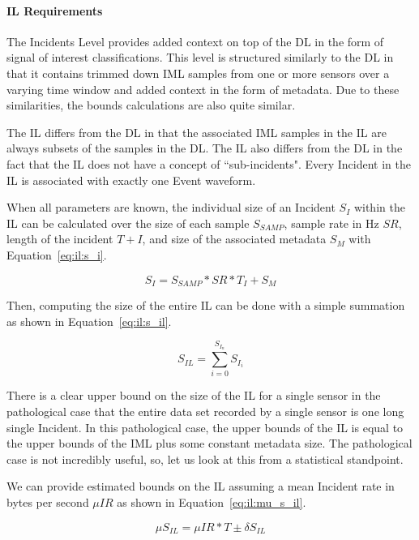 \paragraph{IL Requirements}
The Incidents Level provides added context on top of the DL in the form of signal of interest classifications. This level is structured similarly to the DL in that it contains trimmed down IML samples from one or more sensors over a varying time window and added context in the form of metadata. Due to these similarities, the bounds calculations are also quite similar.

The IL differs from the DL in that the associated IML samples in the IL are always subsets of the samples in the DL\@. The IL also differs from the DL in the fact that the IL does not have a concept of ``sub-incidents". Every Incident in the IL is associated with exactly one Event waveform.

When all parameters are known, the individual size of an Incident $S_{I}$ within the IL can be calculated over the size of each sample $S_{SAMP}$, sample rate in Hz $SR$, length of the incident $T+{I}$, and size of the associated metadata $S_{M}$ with Equation~\ref{eq:il:s_i}.

\begin{equation}\label{eq:il:s_i}
	S_{I} = S_{SAMP} * SR * T_{I} + S_{M}
\end{equation}

Then, computing the size of the entire IL can be done with a simple summation as shown in Equation~\ref{eq:il:s_il}.

\begin{equation}\label{eq:il:s_il}
	S_{IL} = \sum_{i=0}^{S_{I_{n}}} S_{I_{i}}
\end{equation}

There is a clear upper bound on the size of the IL for a single sensor in the pathological case that the entire data set recorded by a single sensor is one long single Incident. In this pathological case, the upper bounds of the IL is equal to the upper bounds of the IML plus some constant metadata size. The pathological case is not incredibly useful, so, let us look at this from a statistical standpoint.

We can provide estimated bounds on the IL assuming a mean Incident rate in bytes per second $\mu IR$ as shown in Equation~\ref{eq:il:mu_s_il}.

\begin{equation}\label{eq:il:mu_s_il}
 \mu S_{IL} = \mu IR * T \pm \delta S_{IL}
\end{equation}

